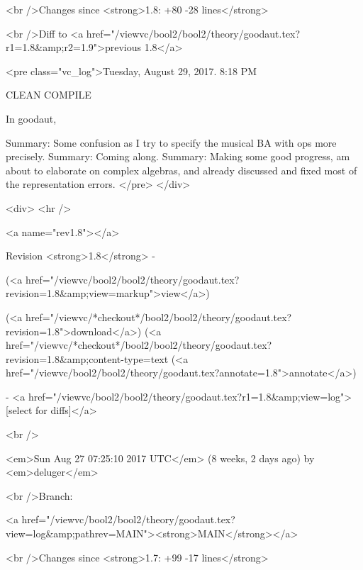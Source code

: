<br />Changes since <strong>1.8: +80 -28 lines</strong>








<br />Diff to <a href="/viewvc/bool2/bool2/theory/goodaut.tex?r1=1.8&amp;r2=1.9">previous 1.8</a>










<pre class="vc_log">Tuesday, August 29, 2017.  8:18 PM

CLEAN COMPILE

In goodaut,

Summary: Some confusion as I try to specify the musical BA with ops more
precisely.
Summary: Coming along.
Summary: Making some good progress, am about to elaborate on complex algebras,
and already discussed and fixed most of the representation errors.
</pre>
</div>



<div>
<hr />

<a name="rev1.8"></a>


Revision <strong>1.8</strong> -


(<a href="/viewvc/bool2/bool2/theory/goodaut.tex?revision=1.8&amp;view=markup">view</a>)


(<a href="/viewvc/*checkout*/bool2/bool2/theory/goodaut.tex?revision=1.8">download</a>)
(<a href="/viewvc/*checkout*/bool2/bool2/theory/goodaut.tex?revision=1.8&amp;content-type=text%
(<a href="/viewvc/bool2/bool2/theory/goodaut.tex?annotate=1.8">annotate</a>)



- <a href="/viewvc/bool2/bool2/theory/goodaut.tex?r1=1.8&amp;view=log">[select for diffs]</a>




<br />

<em>Sun Aug 27 07:25:10 2017 UTC</em>
(8 weeks, 2 days ago)
by <em>deluger</em>


<br />Branch:

<a href="/viewvc/bool2/bool2/theory/goodaut.tex?view=log&amp;pathrev=MAIN"><strong>MAIN</strong></a>







<br />Changes since <strong>1.7: +99 -17 lines</strong>









